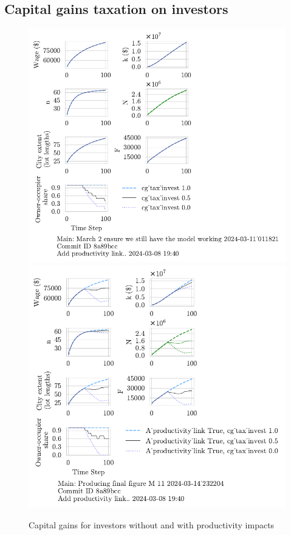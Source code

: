 {\subsection{Capital gains taxation on investors}
\begin{figure}[h!tb] 
    \centering
    \includegraphics[scale=.75, trim={0 1.4cm 4.5cm 0},clip]{fig/cg_tax_invest-Main-011821.pdf} 
    \includegraphics[scale=.75, trim={0 1.4cm 3.7cm 0},clip]{fig/With-productivity_linkcg_tax_invest-232204.pdf} 
    \caption{Capital gains for investors without and with productivity impacts}
    \label{fig:CG-invest_link_W-WO-Cost-of-capital}
\end{figure}


}
